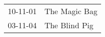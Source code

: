 \begin{supertabular}{p{0.25\columnwidth}p{0.75\columnwidth}}
 10-11-01 &  The Magic Bag \\
 03-11-04 &  The Blind Pig \\
\end{supertabular}
